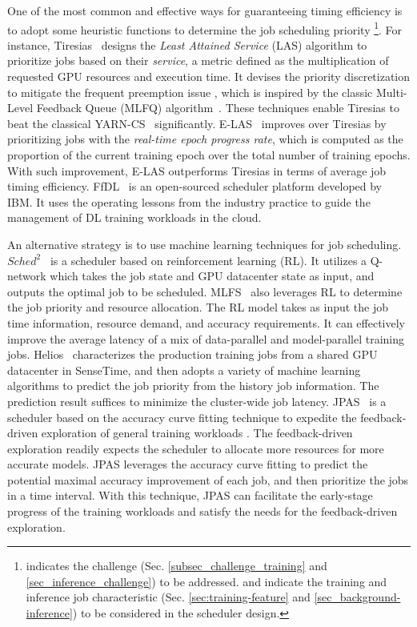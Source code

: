 One of the most common and effective ways for guaranteeing timing efficiency is to adopt some heuristic functions to determine the job scheduling priority {\tiny{}}\footnote{{\tiny{}} indicates the challenge (Sec. \ref{subsec_challenge_training} and \ref{sec_inference_challenge}) to be addressed.  {\tiny{}} and {\tiny{}} indicate the training and inference job characteristic (Sec. \ref{sec:training-feature} and \ref{sec_background-inference}) to be considered in the scheduler design.}. For instance, Tiresias~\cite{Tiresias} designs the \emph{Least Attained Service} (LAS) algorithm to prioritize jobs based on their \textit{service}, a metric defined as the multiplication of requested GPU resources and execution time. It devises the priority discretization to mitigate the frequent preemption issue {\tiny{}}, which is inspired by the classic Multi-Level Feedback Queue (MLFQ) algorithm~\cite{corbato1962experimental,arpaci2018operating,chowdhury2015efficient}. These techniques enable Tiresias to beat the classical YARN-CS~\cite{YARN} significantly. E-LAS~\cite{E-LAS} improves over Tiresias by prioritizing jobs with the  \emph{real-time epoch progress rate}, which is computed as the proportion of the current training epoch over the total number of training epochs. With such improvement, E-LAS outperforms Tiresias in terms of average job timing efficiency. 
FfDL~\cite{FfDL} is an open-sourced scheduler platform developed by IBM. It uses the operating lessons from the industry practice to guide the management of DL training workloads in the cloud.



An alternative strategy is to use machine learning techniques for job scheduling.
$Sched^2$~\cite{Sched2} is a scheduler based on reinforcement learning (RL). It utilizes a Q-network which takes the job state and GPU datacenter state as input, and outputs the optimal job to be scheduled. MLFS~\cite{MLFS} also leverages RL to determine the job priority and resource allocation. The RL model takes as input the job time information, resource demand, and accuracy requirements. It can effectively improve the average latency of a mix of data-parallel and model-parallel training jobs. Helios~\cite{Helios} characterizes the production training jobs from a shared GPU datacenter in SenseTime, and then adopts a variety of machine learning algorithms to predict the job priority from the history job information. The prediction result suffices to minimize the cluster-wide job latency. JPAS~\cite{JPAS} is a scheduler based on the accuracy curve fitting technique to expedite the feedback-driven exploration of general training workloads {\tiny{}}. The feedback-driven exploration readily expects the scheduler to allocate more resources for more accurate models. JPAS leverages the accuracy curve fitting to predict the potential maximal accuracy improvement of each job, and then prioritize the jobs in a time interval. With this technique, JPAS can facilitate the early-stage progress of the training workloads and satisfy the needs for the feedback-driven exploration.

